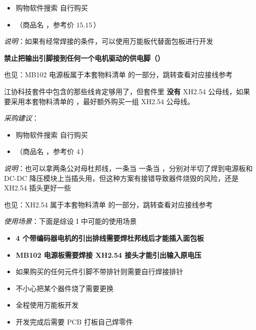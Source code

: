 \documentclass[11pt,a4paper]{article}
\begin{document}
\begin{itemize}
  \item 购物软件搜索  自行购买
  \item {}（商品名 ，参考价 $15.15$\,\yuan）
\end{itemize}

\emph{说明}：如果有经常焊接的条件，可以使用万能板代替面包板进行开发

\begin{calloutwarning}
  \textbf{禁止把输出引脚接到任何一个电机驱动的供电脚（）}
\end{calloutwarning}

\begin{seealso}
  也见：MB102 电源板属于本套物料清单  的一部分，跳转查看对应接线参考
\end{seealso}

\label{pt:wiring}

江协科技套件中包含的那些线肯定够用了，但套件里 \textbf{没有} XH2.54 公母线，如果要采用本套物料清单的 ，最好额外购买一组 XH2.54 公母线。

\emph{采购建议}：

\begin{itemize}
  \item 购物软件搜索  自行购买
  \item {}（商品名 ，参考价 $4$\,\yuan）
\end{itemize}

\emph{说明}：也可以拿两条公对母杜邦线，一条当  一条当 ，分别对半切了焊到电源板和 DC-DC 降压模块上当插头用，但这种方案有接错导致器件烧毁的风险，还是 XH2.54 插头更好一些

\begin{seealso}
  也见：XH2.54 属于本套物料清单  的一部分，跳转查看对应接线参考
\end{seealso}

\label{pt:solder}

\emph{使用场景}：下面是综设 I 中可能的使用场景

\begin{itemize}
  \item \textbf{4 个带编码器电机的引出排线需要焊杜邦线后才能插入面包板}
  \item \textbf{MB102 电源板需要焊接 XH2.54 接头才能引出输入原电压}
  \item 如果购买的任何元件引脚不带排针则需要自行焊接排针
  \item 不小心把某个器件烧了需要更换
  \item 全程使用万能板开发
  \item 开发完成后需要 PCB 打板自己焊零件
\end{itemize}
\end{document}
